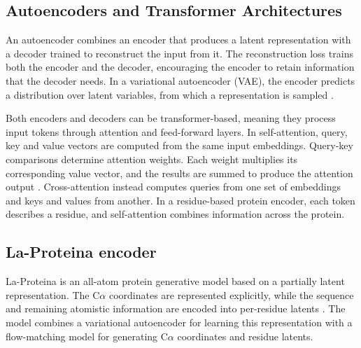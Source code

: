 \subsection{Autoencoders and Transformer Architectures}
\label{sec:background-transformers}
An autoencoder combines an encoder that produces a latent representation with a decoder trained to reconstruct the input from it. The reconstruction loss trains both the encoder and the decoder, encouraging the encoder to retain information that the decoder needs.
In a variational autoencoder (VAE), the encoder predicts a distribution over latent variables, from which a representation is sampled \citep{kingma2013autoencoding}.

Both encoders and decoders can be transformer-based, meaning they process input tokens through attention and feed-forward layers. In self-attention, query, key and value vectors are computed from the same input embeddings. Query-key comparisons determine attention weights. Each weight multiplies its corresponding value vector, and the results are summed to produce the attention output \citep{vaswani2017attention}. Cross-attention instead computes queries from one set of embeddings and keys and values from another. In a residue-based protein encoder, each token describes a residue, and self-attention combines information across the protein.



\subsection{La-Proteina encoder}
\label{sec:background-autoencoder}
La-Proteina is an all-atom protein generative model based on a partially latent representation. The C$\alpha$ coordinates are represented explicitly, while the sequence and remaining atomistic information are encoded into per-residue latents \citep{la-proteina}.
The model combines a variational autoencoder for learning this representation with a flow-matching model for generating C$\alpha$ coordinates and residue latents. 

